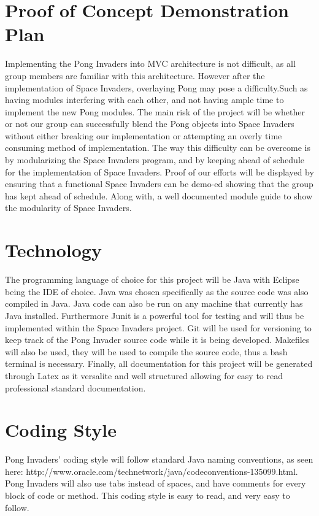 \documentclass{article}
\begin{document}
\section{Proof of Concept Demonstration Plan}

\indent Implementing the Pong Invaders into MVC architecture is not difficult, as all group members are familiar with this architecture. However after the implementation of Space Invaders, overlaying Pong may pose a difficulty.Such as having modules interfering with each other, and not having ample time to implement the new Pong modules. The main risk of the project will be whether or not our group can successfully blend the Pong objects into Space Invaders without either breaking our implementation or attempting an overly time consuming method of implementation. The way this difficulty can be overcome is by modularizing the Space Invaders program, and by keeping ahead of schedule for the implementation of Space Invaders. Proof of our efforts will be displayed by ensuring that a functional Space Invaders can be demo-ed showing that the group has kept ahead of schedule. Along with, a well documented module guide to show the modularity of Space Invaders. 

\section{Technology}
\indent The programming language of choice for this project will be Java with Eclipse being the IDE of choice. Java was chosen specifically as the source code was also compiled in Java. Java code can also be run on any machine that currently has Java installed. Furthermore Junit is a powerful tool for testing and will thus be implemented within the Space Invaders project. Git will be used for versioning to keep track of the Pong Invader source code while it is being developed. Makefiles will also be used, they will be used to compile the source code, thus a bash terminal is necessary. Finally, all documentation for this project will be generated through Latex as it versalite and well structured allowing for easy to read professional standard documentation.
\section{Coding Style}
\indent Pong Invaders' coding style will follow standard Java naming conventions, as seen here: http://www.oracle.com/technetwork/java/codeconventions-135099.html. Pong Invaders will also use tabs instead of spaces, and have comments for every block of code or method. This coding style is easy to read, and very easy to follow.
\end{document}
